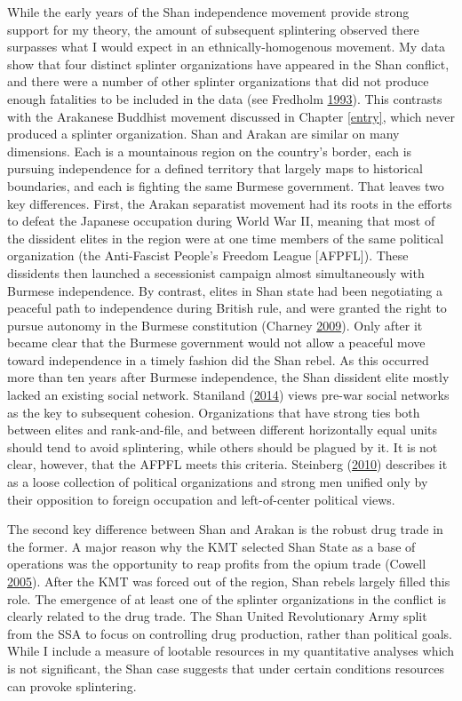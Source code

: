 \documentclass[12pt,]{book}
\theoremstyle{definition}
\theoremstyle{definition}
\theoremstyle{remark}
\begin{document}
While the early years of the Shan independence movement provide strong
support for my theory, the amount of subsequent splintering observed
there surpasses what I would expect in an ethnically-homogenous
movement. My data show that four distinct splinter organizations have
appeared in the Shan conflict, and there were a number of other splinter
organizations that did not produce enough fatalities to be included in
the data (see Fredholm \protect\hyperlink{ref-Fredholm1993}{1993}). This
contrasts with the Arakanese Buddhist movement discussed in Chapter
\ref{entry}, which never produced a splinter organization. Shan and
Arakan are similar on many dimensions. Each is a mountainous region on
the country's border, each is pursuing independence for a defined
territory that largely maps to historical boundaries, and each is
fighting the same Burmese government. That leaves two key differences.
First, the Arakan separatist movement had its roots in the efforts to
defeat the Japanese occupation during World War II, meaning that most of
the dissident elites in the region were at one time members of the same
political organization (the Anti-Fascist People's Freedom League
{[}AFPFL{]}). These dissidents then launched a secessionist campaign
almost simultaneously with Burmese independence. By contrast, elites in
Shan state had been negotiating a peaceful path to independence during
British rule, and were granted the right to pursue autonomy in the
Burmese constitution (Charney
\protect\hyperlink{ref-Charney2009}{2009}). Only after it became clear
that the Burmese government would not allow a peaceful move toward
independence in a timely fashion did the Shan rebel. As this occurred
more than ten years after Burmese independence, the Shan dissident elite
mostly lacked an existing social network. Staniland
(\protect\hyperlink{ref-Staniland2014}{2014}) views pre-war social
networks as the key to subsequent cohesion. Organizations that have
strong ties both between elites and rank-and-file, and between different
horizontally equal units should tend to avoid splintering, while others
should be plagued by it. It is not clear, however, that the AFPFL meets
this criteria. Steinberg (\protect\hyperlink{ref-Steinberg2010}{2010})
describes it as a loose collection of political organizations and strong
men unified only by their opposition to foreign occupation and
left-of-center political views.

The second key difference between Shan and Arakan is the robust drug
trade in the former. A major reason why the KMT selected Shan State as a
base of operations was the opportunity to reap profits from the opium
trade (Cowell \protect\hyperlink{ref-Cowell2005}{2005}). After the KMT
was forced out of the region, Shan rebels largely filled this role. The
emergence of at least one of the splinter organizations in the conflict
is clearly related to the drug trade. The Shan United Revolutionary Army
split from the SSA to focus on controlling drug production, rather than
political goals. While I include a measure of lootable resources in my
quantitative analyses which is not significant, the Shan case suggests
that under certain conditions resources can provoke splintering.
\end{document}
